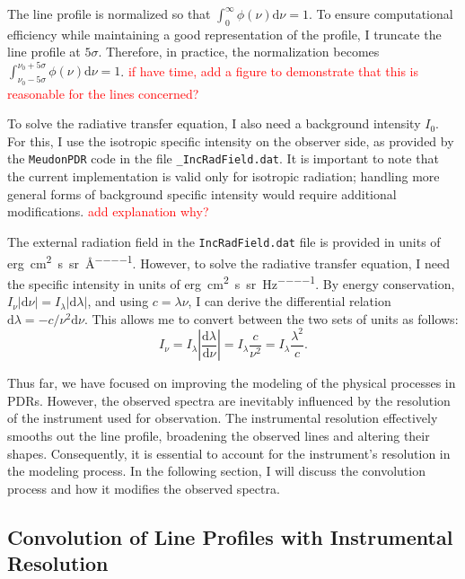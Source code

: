 \documentclass[12pt,a4paper]{article}
\newcommand{\dd}[1]{\mathrm{d}#1}
\newcommand{\mdpdr}{\texttt{MeudonPDR} code}
\newcommand{\qt}[1]{\textcolor{red}{#1}}
\begin{document}
The line profile is normalized so that $\int_0^{\infty} \phi(\nu) \dd{\nu} = 1$. To ensure computational efficiency while maintaining a good representation of the profile, I truncate the line profile at $5\sigma$. Therefore, in practice, the normalization becomes $\int_{\nu_0 - 5\sigma}^{\nu_0 + 5\sigma}\phi(\nu) \dd{\nu} = 1$.
\qt{if have time, add a figure to demonstrate that this is reasonable for the lines concerned?}

To solve the radiative transfer equation, I also need a background intensity $I_0$. For this, I use the isotropic specific intensity on the observer side, as provided by the \mdpdr{} in the file \texttt{_IncRadField.dat}. It is important to note that the current implementation is valid only for isotropic radiation; handling more general forms of background specific intensity would require additional modifications. \qt{add explanation why?}

The external radiation field in the \texttt{IncRadField.dat} file is provided in units of \unit{erg\per\centi\meter\squared\per\second\per\steradian\per\angstrom}. However, to solve the radiative transfer equation, I need the specific intensity in units of \unit{erg\per\centi\meter\squared\per\second\per\steradian\per\Hz}. By energy conservation, $I_\nu |\dd{\nu}| = I_\lambda |\dd{\lambda}|$, and using $c = \lambda\nu$, I can derive the differential relation $\dd{\lambda} = -c/\nu^2 \dd{\nu}$. This allows me to convert between the two sets of units as follows:
\begin{equation}
    I_\nu = I_\lambda \left|\frac{\dd{\lambda}}{\dd{\nu}}\right| = I_\lambda \frac{c}{\nu^2} = I_\lambda \frac{\lambda^2}{c}.
\end{equation}

Thus far, we have focused on improving the modeling of the physical processes in PDRs. However, the observed spectra are inevitably influenced by the resolution of the instrument used for observation. The instrumental resolution effectively smooths out the line profile, broadening the observed lines and altering their shapes. Consequently, it is essential to account for the instrument's resolution in the modeling process. In the following section, I will discuss the convolution process and how it modifies the observed spectra.

\subsection{Convolution of Line Profiles with Instrumental Resolution} \label{sec:convolution}
\end{document}
